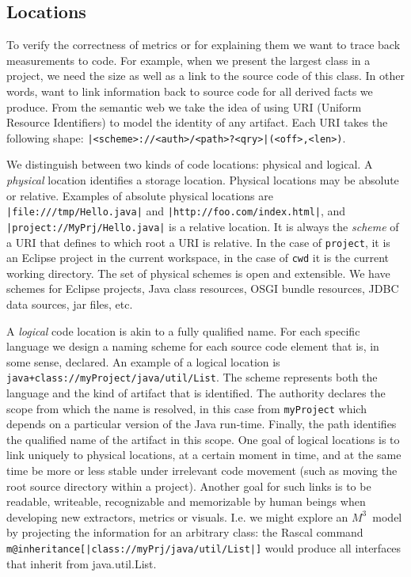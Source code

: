\documentclass[conference]{IEEEtran}
\newcommand{\loc}[1]{\small{\texttt{#1}}}
\newcommand{\mthree}{\ensuremath{M^3}}
\begin{document}
\subsection{Locations} 

To verify the correctness of metrics or for explaining them we want to trace
back measurements to code. For example, when we present the largest class in a
project, we need the size as well as a link to the source code of this class.
In other words, want to link information back to source code for all derived
facts we produce. From the semantic web we take the idea of using URI (Uniform
Resource Identifiers) to model the identity of any artifact. Each URI takes
the following shape: \loc{|<scheme>://<auth>/<path>?<qry>|(<off>,<len>)}.

We distinguish between two kinds of code locations: physical and logical. A
\emph{physical} location identifies a storage location. Physical locations may
be absolute or relative. Examples of absolute physical locations are
\loc{|file:///tmp/Hello.java|} and \loc{|http://foo.com/index.html|}, and
\loc{|project://MyPrj/Hello.java|} is a relative location. It is always the
\emph{scheme} of a URI that defines to which root a URI is relative. In the
case of \texttt{project}, it is an Eclipse project in the current workspace,
in the case of \texttt{cwd} it is the current working directory. The set of
physical schemes is open and extensible. We have schemes for Eclipse projects,
Java class resources, OSGI bundle resources, JDBC data sources, jar files,
etc.

A \emph{logical} code location is akin to a fully qualified name. For each
specific language we design a naming scheme for each source code element that
is, in some sense, declared. An example of a logical location is
\loc{java+class://myProject/java/util/List}. The scheme represents both the
language and the kind of artifact that is identified. The authority declares
the scope from which the name is resolved, in this case from
\texttt{myProject} which depends on a particular version of the Java run-time.
Finally, the path identifies the qualified name of the artifact in this scope.
One goal of logical locations is to link uniquely to physical locations, at a
certain moment in time, and at the same time be more or less stable under
irrelevant code movement (such as moving the root source directory within a
project). Another goal for such links is to be readable, writeable,
recognizable and memorizable by human beings when developing new extractors,
metrics or visuals. I.e. we might explore an \mthree\ model by projecting the
information for an arbitrary class: the Rascal command
\texttt{m@inheritance[|class://myPrj/java/util/List|]} would produce all
interfaces that inherit from java.util.List.
\end{document}
